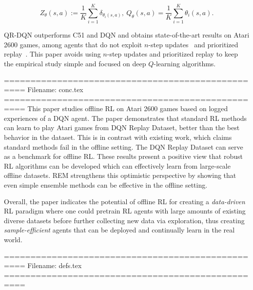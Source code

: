 \begin{equation*}
Z_\theta(s, a) := \frac{1}{K} \sum_{i=1}^K \delta_{\theta_i(s,
a)},\ Q_{\theta}(s, a)
= \frac{1}{K} \sum_{i=1}^K \theta_i(s, a).
\end{equation*}

QR-DQN %
outperforms C51 and DQN and obtains state-of-the-art results on
Atari 2600 games, among agents that do not exploit $n$-step
updates~\citep{sutton1988learning} and prioritized replay~\citep{schaul2015prioritized}. This paper avoids using
$n$-step updates and prioritized replay to keep the empirical study
simple and focused on deep $Q$-learning algorithms.




==================================================
Filename: conc.tex
==================================================
This paper studies offline RL on Atari 2600 games based on
logged experiences of a DQN agent. The paper demonstrates that standard RL methods can learn to play Atari games from DQN Replay Dataset, better than the best behavior in the dataset. This is in contrast with existing work, which claims standard methods fail in the offline setting. The DQN Replay Dataset can serve as a benchmark
for offline RL. 
These results present a positive view that robust RL
algorithms can be developed which can effectively learn from large-scale offline datasets. 
REM strengthens this optimistic perspective by showing that even simple ensemble methods can 
be effective in the offline setting.

Overall, the paper indicates the potential of offline RL for creating a \textit{data-driven} RL paradigm where one could pretrain RL agents with large amounts of existing diverse datasets before further collecting new data via exploration, thus creating \textit{sample-efficient} agents that can be deployed and continually learn in the real world.


==================================================
Filename: defs.tex
==================================================
\usepackage{dsfont}
\usepackage{amsthm}
\usepackage{amsmath}
\usepackage{amssymb}
\usepackage{color}
\usepackage{xspace}
\usepackage{graphicx}
\usepackage{pgfplots, pgfplotstable}
\usepackage{xcolor,colortbl}

